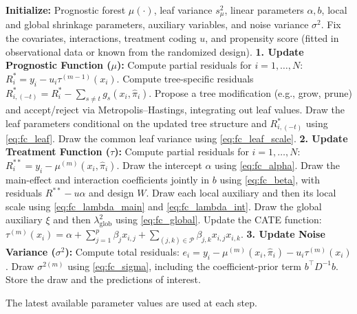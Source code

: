 \documentclass[12pt]{article}
\newcommand{\rev}[1]{\ifdefined\ReviewChanges{\color{revisionblue}#1}\else#1\fi}
\begin{document}
\begin{algorithm}[htbp]
\caption{Bayesian Backfitting MCMC Scheme for \rev{SP-BART}}
\label{algorithm backfitting}
\begin{algorithmic}[1]
\State \textbf{Initialize:} Prognostic forest $\mu(\cdot)$, leaf variance
$s_\mu^2$, linear parameters $\alpha,b$, local and global shrinkage
parameters, auxiliary variables, and noise variance $\sigma^2$.
\State Fix the covariates, interactions, treatment coding $u$, and propensity
score (fitted in observational data or known from the randomized design).
    \State \textbf{1. Update Prognostic Function ($\mu$):}
    \State Compute partial residuals for $i=1,\ldots,N$:
    \State \quad $R_i^*=y_i-u_i\tau^{(m-1)}(x_i)$.
        \State Compute tree-specific residuals
        $R^*_{i,(-t)}=R_i^*-\sum_{s\ne t}g_s(x_i,\hat\pi_i)$.
        \State Propose a tree modification (e.g., grow, prune) and
        accept/reject via Metropolis--Hastings, integrating out leaf values.
        \State Draw the leaf parameters conditional on the updated tree
        structure and $R^*_{i,(-t)}$ using \eqref{eq:fc_leaf}.
    \EndFor
    \State Draw the common leaf variance using \eqref{eq:fc_leaf_scale}.
    \State \textbf{2. Update Treatment Function ($\tau$):}
    \State Compute partial residuals for $i=1,\ldots,N$:
    \State \quad $R_i^{**}=y_i-\mu^{(m)}(x_i,\hat\pi_i)$.
    \State Draw the intercept $\alpha$ using \eqref{eq:fc_alpha}.
    \State Draw the main-effect and interaction coefficients jointly in $b$
    using \eqref{eq:fc_beta}, with residuals $R^{**}-u\alpha$ and design $W$.
    \State Draw each local auxiliary and then its local scale using
    \eqref{eq:fc_lambda_main} and \eqref{eq:fc_lambda_int}.
    \State Draw the global auxiliary $\xi$ and then
    $\lambda_{\mathrm{glob}}^2$ using \eqref{eq:fc_global}.
    \State Update the CATE function:
    \State \quad $\tau^{(m)}(x_i)=\alpha+\sum_{j=1}^{p}\beta_j x_{i,j}+\sum_{(j,k)\in\mathcal P}\beta_{j,k}x_{i,j}x_{i,k}$.
    \State \textbf{3. Update Noise Variance ($\sigma^2$):}
    \State Compute total residuals:
    \State \quad $e_i=y_i-\mu^{(m)}(x_i,\hat\pi_i)-u_i\tau^{(m)}(x_i)$.
    \State Draw $\sigma^{2(m)}$ using \eqref{eq:fc_sigma}, including the
    coefficient-prior term $b^\top D^{-1}b$.
        \State Store the draw and the predictions of interest.
    \EndIf
\EndFor
\end{algorithmic}
\end{algorithm}

The latest available parameter values are used at each step.

\FloatBarrier


\end{document}
